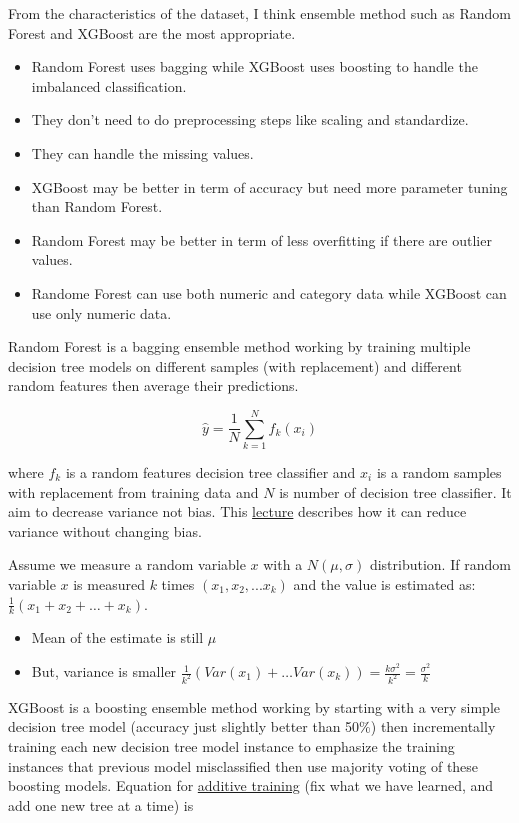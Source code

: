 \documentclass[11pt]{article}
\begin{document}
From the characteristics of the dataset, I think ensemble method such as
Random Forest and XGBoost are the most appropriate.

\begin{itemize}
\itemsep1pt\parskip0pt
\item
  Random Forest uses bagging while XGBoost uses boosting to handle the
  imbalanced classification.\\
\item
  They don't need to do preprocessing steps like scaling and
  standardize.
\item
  They can handle the missing values.
\item
  XGBoost may be better in term of accuracy but need more parameter
  tuning than Random Forest.
\item
  Random Forest may be better in term of less overfitting if there are
  outlier values.
\item
  Randome Forest can use both numeric and category data while XGBoost
  can use only numeric data.
\end{itemize}

Random Forest is a bagging ensemble method working by training multiple
decision tree models on different samples (with replacement) and
different random features then average their predictions.

\[  \hat{y}=\frac{1}{N}\sum_{k=1}^N f_k(x_i) \]

where $f_k$ is a random features decision tree classifier and $x_i$ is a
random samples with replacement from training data and $N$ is number of
decision tree classifier. It aim to decrease variance not bias. This
\href{https://people.cs.pitt.edu/~milos/courses/cs2750-Spring04/lectures/class23.pdf}{lecture}
describes how it can reduce variance without changing bias.

Assume we measure a random variable $x$ with a $N(\mu,\sigma)$
distribution. If random variable $x$ is measured $k$ times
$(x_1,x_2,...x_k)$ and the value is estimated as:
$\frac{1}{k}(x_1+x_2+…+x_k)$.

\begin{itemize}
\itemsep1pt\parskip0pt
\item
  Mean of the estimate is still $\mu$
\item
  But, variance is smaller
  $\frac{1}{k^2}(Var(x_1)+…Var(x_k)) = \frac{k\sigma^2}{k^2} = \frac{\sigma^2 }{k}$
\end{itemize}

XGBoost is a boosting ensemble method working by starting with a very
simple decision tree model (accuracy just slightly better than 50\%)
then incrementally training each new decision tree model instance to
emphasize the training instances that previous model misclassified then
use majority voting of these boosting models. Equation for
\href{http://xgboost.readthedocs.io/en/latest/model.html\#additive-training}{additive
training} (fix what we have learned, and add one new tree at a time) is
\end{document}
